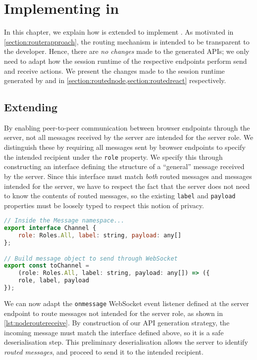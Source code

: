 \chapter{Implementing \newtheory in \codegen}
\label{chap:impl}

In this chapter, we
explain how \codegen
is extended to implement \newtheory.
As motivated in \cref{section:routerapproach},
the routing mechanism is intended to be transparent
to the developer.
Hence, there are \textit{no changes} made to the
generated APIs; we only need to adapt
how the session runtime of the respective
endpoints perform send and receive actions.
We present the changes made to the session
runtime generated by \nodecodegen
and \reactcodegen in 
\cref{section:routednode,section:routedreact}
respectively.

\section{Extending \nodecodegen}
\label{section:routednode}

By enabling peer-to-peer communication
between browser endpoints through the server,
not all messages received by the server are intended
for the server role.
We distinguish these by requiring all messages sent
by browser endpoints to specify the intended recipient
under the \texttt{role} property.
We specify this through constructing an interface
defining the structure of a 
``general'' message received by the 
server.
Since this interface must match \textit{both}
routed messages and messages intended for the server,
we have to respect the fact that the server
does not need to know the contents of routed messages,
so the existing \texttt{label}
and \texttt{payload} properties must be loosely typed
to respect this notion of privacy.

\begin{lstlisting}[language=javascript]
// Inside the Message namespace...
export interface Channel {
	role: Roles.All, label: string, payload: any[]
};

// Build message object to send through WebSocket
export const toChannel = 
	(role: Roles.All, label: string, payload: any[]) => ({
	role, label, payload
});
\end{lstlisting}

We can now adapt the \texttt{onmessage}
WebSocket event listener defined at the server endpoint
to route messages not intended for the server role,
as shown in \cref{lst:noderoutereceive}.
By construction of our API generation strategy,
the incoming message must match the interface defined
above, so it is a safe deserialisation step.
This preliminary deserialisation allows the server
to identify \textit{routed messages}, and proceed to
send it to the intended recipient.

